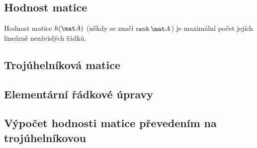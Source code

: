 \subsection{Hodnost matice}

Hodnost matice $h(\mat A)$ (někdy se značí $\mathrm{rank}\, \mat A$) je maximální počet jejích lineárně nezávislých řádků.

\begin{example}

\end{example}

\subsection{Trojúhelníková matice}

\subsection{Elementární řádkové úpravy}

\subsection{Výpočet hodnosti matice převedením na trojúhelníkovou}